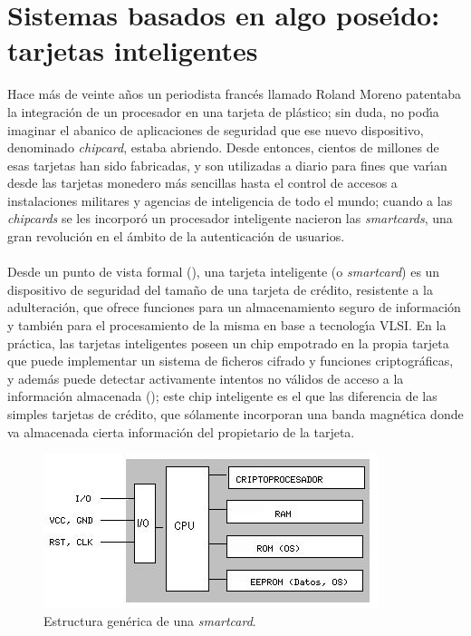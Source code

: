 \section{Sistemas basados en algo pose\'{\i}do: tarjetas inteligentes}
Hace m\'as de veinte a\~nos un periodista franc\'es llamado Roland Moreno 
patentaba la integraci\'on de un procesador en una tarjeta de pl\'astico; sin
duda, no pod\'{\i}a imaginar el abanico de aplicaciones de seguridad que ese
nuevo dispositivo, denominado {\it chipcard}, estaba abriendo. Desde entonces,
cientos de millones de esas tarjetas han sido fabricadas, y son utilizadas a
diario para fines que var\'{\i}an desde las tarjetas monedero m\'as sencillas
hasta el control de accesos a instalaciones militares y agencias de 
inteligencia de todo el mundo; cuando a las {\it chipcards} se les incorpor\'o
un procesador inteligente nacieron las {\it smartcards}, una gran revoluci\'on
en el \'ambito de la autenticaci\'on de usuarios.\\
\\Desde un punto de vista formal (\cite{kn:gui92}), una tarjeta inteligente (o 
{\it smartcard}) es un dispositivo de seguridad del tama\~no de una tarjeta de 
cr\'edito, resistente a la adulteraci\'on, que ofrece funciones para un
almacenamiento seguro de informaci\'on y tambi\'en para el procesamiento de
la misma en base a tecnolog\'{\i}a VLSI. En la pr\'actica, las tarjetas 
inteligentes poseen un chip empotrado en la propia tarjeta que puede implementar
un sistema de ficheros cifrado y funciones criptogr\'aficas, y adem\'as puede
detectar activamente intentos no v\'alidos de acceso a la informaci\'on 
almacenada (\cite{kn:rc570}); este chip inteligente es el que las diferencia de
las simples tarjetas de cr\'edito, que s\'olamente incorporan una banda 
magn\'etica donde va almacenada cierta informaci\'on del propietario de la 
tarjeta.\\
\begin{figure}
\begin{center}
\includegraphics{smartcard.png}
\end{center}
\caption{Estructura gen\'erica de una {\it smartcard}.}
\label{sc}
\end{figure}
